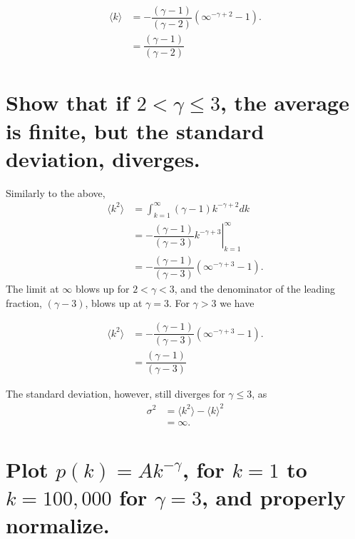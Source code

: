 \documentclass[onecolumn,10pt]{jhwhw}
\begin{document}
\begin{align*}
\langle k \rangle &= -\dfrac{(\gamma - 1)}{(\gamma - 2)} \left(\infty^{-\gamma+2} - 1 \right). \\
                  &= \dfrac{(\gamma - 1)}{(\gamma - 2)}
\end{align*}


\part{Show that if $2 < \gamma \leq 3$, the average is finite, but the standard deviation, diverges.}

Similarly to the above,
\begin{align*}
\langle k^2 \rangle &= \int_{k=1}^{\infty} (\gamma - 1) k^{-\gamma+2} dk \\
                  &= \left. -\dfrac{(\gamma - 1)}{(\gamma - 3)} k^{-\gamma+3} \right |_{k=1}^{\infty} \\
                  &= -\dfrac{(\gamma - 1)}{(\gamma - 3)} \left(\infty^{-\gamma+3} - 1 \right).
\end{align*}
The limit at $\infty$ blows up for $2 < \gamma < 3$, and the denominator of the leading fraction, $(\gamma - 3)$, blows up at $\gamma = 3$. For $\gamma > 3$ we have

\begin{align*}
\langle k^2 \rangle &= -\dfrac{(\gamma - 1)}{(\gamma - 3)} \left(\infty^{-\gamma+3} - 1 \right). \\
                  &= \dfrac{(\gamma - 1)}{(\gamma - 3)}
\end{align*}

The standard deviation, however, still diverges for $\gamma \leq 3$, as
\begin{align*}
\sigma^2 &= \langle k^2 \rangle - \langle k \rangle^2 \\
         &= \infty.
\end{align*}

\clearpage
\part{Plot $p(k) = Ak^{−\gamma}$, for $k = 1$ to $k = 100,000$ for $\gamma = 3$, and properly normalize.}
\end{document}
